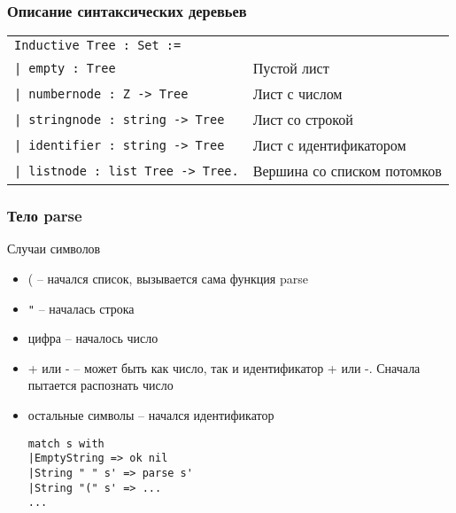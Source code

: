 \documentclass[10pt,a4paper]{beamer}
\begin{document}
\begin{frame}[fragile]
\frametitle{Описание синтаксических деревьев}

\begin{tabular}{ll}

\texttt{Inductive Tree : Set :=} &\\
\texttt{| empty : Tree}                  & Пустой лист \\
\texttt{| numbernode : Z -> Tree}        & Лист с числом \\
\texttt{| stringnode : string -> Tree}   & Лист со строкой \\
\texttt{| identifier : string -> Tree}   & Лист с идентификатором \\
\texttt{| listnode : list Tree -> Tree.} & Вершина со списком потомков

\end{tabular}

\end{frame}

\begin{frame}[fragile]
\frametitle{Тело parse}

Случаи символов
\begin{itemize}
\item ( -- начался список, вызывается сама функция parse
\item \texttt{"} -- началась строка
\item цифра -- началось число
\item + или - -- может быть как число, так и идентификатор + или -. Сначала пытается распознать число
\item остальные символы -- начался идентификатор

\begin{lstlisting}
match s with
|EmptyString => ok nil
|String " " s' => parse s'
|String "(" s' => ...
...
\end{lstlisting}


\end{itemize}

\end{frame}
\end{document}
